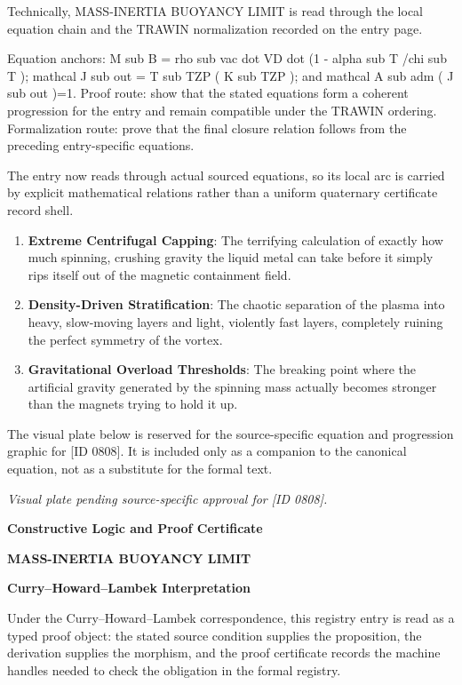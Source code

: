 Technically, MASS-INERTIA BUOYANCY LIMIT is read through the local equation chain and the TRAWIN normalization recorded on the entry page.

Equation anchors: M sub B = rho sub vac dot VD dot (1 - alpha sub T /chi sub T ); mathcal J sub out = T sub TZP ( K sub TZP ); and mathcal A sub adm ( J sub out )=1. Proof route: show that the stated equations form a coherent progression for the entry and remain compatible under the TRAWIN ordering. Formalization route: prove that the final closure relation follows from the preceding entry-specific equations.

The entry now reads through actual sourced equations, so its local arc is carried by explicit mathematical relations rather than a uniform quaternary certificate record shell.
\endgroup

\begin{enumerate}[leftmargin=1.6em,itemsep=6pt,topsep=4pt]
\item \textbf{Extreme Centrifugal Capping}: The terrifying calculation of exactly how much spinning, crushing gravity the liquid metal can take before it simply rips itself out of the magnetic containment field.
\item \textbf{Density-Driven Stratification}: The chaotic separation of the plasma into heavy, slow-moving layers and light, violently fast layers, completely ruining the perfect symmetry of the vortex.
\item \textbf{Gravitational Overload Thresholds}: The breaking point where the artificial gravity generated by the spinning mass actually becomes stronger than the magnets trying to hold it up.
\end{enumerate}

\begingroup\footnotesize\sloppy
The visual plate below is reserved for the source-specific equation and progression graphic for [ID 0808]. It is included only as a companion to the canonical equation, not as a substitute for the formal text.
\par\endgroup
\begingroup\footnotesize\itshape
Visual plate pending source-specific approval for [ID 0808].
\par\endgroup

\clearpage
\begingroup\tzpsupportsetup
\noindent\textbf{\fontsize{10.8pt}{12.8pt}\selectfont [ID 0808] Constructive Logic and Proof Certificate}\par
\noindent\textbf{\fontsize{10pt}{12pt}\selectfont MASS-INERTIA BUOYANCY LIMIT}\par
\vspace{0.45em}
\begingroup
\footnotesize
\setlength{\parskip}{0.22em}
\setlength{\parindent}{0pt}
\noindent\textbf{Curry--Howard--Lambek Interpretation}\par
Under the Curry--Howard--Lambek correspondence, this registry entry is read as a typed proof
object: the stated source condition supplies the proposition, the derivation supplies the
morphism, and the proof certificate records the machine handles needed to check the obligation
in the formal registry.

